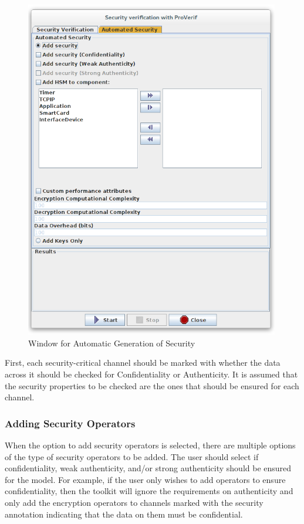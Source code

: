 \documentclass[12pt]{article}
\begin{document}
\begin{figure}[htbp]
\centering
\includegraphics[width=0.99\textwidth]{fig/automaticgeneration.png}
\caption{Window for Automatic Generation of Security} \label{fig:autogen}
\end{figure}

First, each security-critical channel should be marked with whether the data across it should be checked for Confidentiality or Authenticity. It is assumed that the security properties to be checked are the ones that should be ensured for each channel.

\subsubsection{Adding Security Operators}

When the option to add security operators is selected, there are multiple options of the type of security operators to be added. The user should select if confidentiality, weak authenticity, and/or strong authenticity should be ensured for the model. For example, if the user only wishes to add operators to ensure confidentiality, then the toolkit will ignore the requirements on authenticity and only add the encryption operators to channels marked with the security annotation indicating that the data on them must be confidential.
\end{document}
